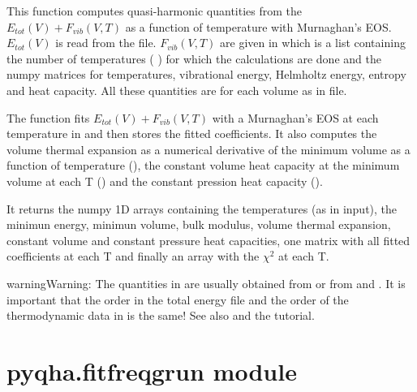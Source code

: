 \documentclass[letterpaper,10pt,english]{sphinxmanual}
\begin{document}

\begin{fulllineitems}
This function computes quasi-harmonic quantities from the 
\(E_{tot}(V)+F_{vib}(V,T)\) as a function of temperature with Murnaghan's
EOS. \(E_{tot}(V)\) is read from the  file. \(F_{vib}(V,T)\)
are given in  which is a list containing the number of temperatures
(  ) for which the calculations are done and the numpy matrices for 
temperatures, vibrational energy, Helmholtz energy, entropy and
heat capacity. All these quantities are for each volume as in  file.

The function fits \(E_{tot}(V)+F_{vib}(V,T)\) with a Murnaghan's EOS
at each temperature in  and then stores the fitted coefficients.
It also computes the volume thermal expansion as a numerical derivative of
the minimum volume as a function of temperature (), the
constant volume heat capacity at the minimum volume at each T
() and the constant pression heat capacity ().

It returns the numpy 1D arrays containing the temperatures (as in input), the
minimun energy, minimun volume, bulk modulus, volume thermal expansion, constant
volume and constant pressure heat capacities, one matrix with all fitted 
coefficients at each T and finally an array with the \(\chi^2\) at each T.

\begin{sphinxadmonition}{warning}{Warning:}
The quantities in  are usually obtained from 
or from  and . It is
important that the order in the total energy file  and the order of
the thermodynamic data in  is the same!  See also  and 
the tutorial.
\end{sphinxadmonition}

\end{fulllineitems}



\section{pyqha.fitfreqgrun module}
\label{pyqha:pyqha-fitfreqgrun-module}\label{pyqha:module-pyqha.fitfreqgrun}
\end{document}
